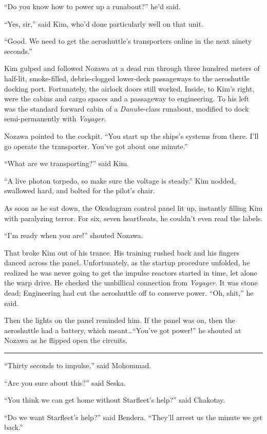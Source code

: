 \documentclass[twoside,letterpaper,12pt]{memoir}
\begin{document}
``Do you know how to power up a runabout?'' he'd said.

``Yes, sir,'' said Kim, who'd done particularly well on that unit.

``Good. We need to get the aeroshuttle's transporters online in the next ninety seconds.''

Kim gulped and followed Nozawa at a dead run through three hundred meters of half-lit, smoke-filled, debris-clogged lower-deck passageways to the aeroshuttle docking port. Fortunately, the airlock doors still worked. Inside, to Kim's right, were the cabins and cargo spaces and a passageway to engineering. To his left was the standard forward cabin of a \textit{Danube}-class runabout, modified to dock semi-permanently with \textit{Voyager}.

Nozawa pointed to the cockpit. ``You start up the ships's systems from there. I'll go operate the transporter. You've got about one minute.''

``What are we transporting?'' said Kim.

``A live photon torpedo, so make sure the voltage is steady.'' Kim nodded, swallowed hard, and bolted for the pilot's chair.

As soon as he sat down, the Okudagram control panel lit up, instantly filling Kim with paralyzing terror. For six, seven heartbeats, he couldn't even read the labels.

``I'm ready when you are!'' shouted Nozawa.

That broke Kim out of his trance. His training rushed back and his fingers danced across the panel. Unfortunately, as the startup procedure unfolded, he realized he was never going to get the impulse reactors started in time, let alone the warp drive. He checked the umbillical connection from \textit{Voyager}. It was stone dead; Engineering had cut the aeroshuttle off to conserve power. ``Oh, shit,'' he said.

Then the lights on the panel reminded him. If the panel was on, then the aeroshuttle had a battery, which meant\ldots ``You've got power!'' he shouted at Nozawa as he flipped open the circuits.

\fancybreak{\rule{3cm}{0.4 pt}}
``Thirty seconds to impulse,'' said Mohommad.

``Are you sure about this?'' said Seska.

``You think we can get home without Starfleet's help?'' said Chakotay.

``Do we want Starfleet's help?'' said Bendera. ``They'll arrest us the minute we get back.''
\end{document}
